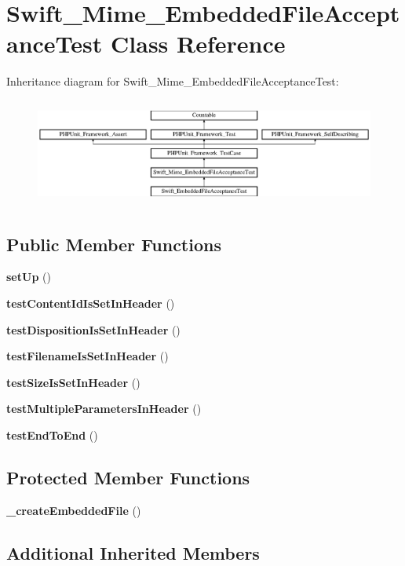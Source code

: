 \section{Swift\+\_\+\+Mime\+\_\+\+Embedded\+File\+Acceptance\+Test Class Reference}
\label{class_swift___mime___embedded_file_acceptance_test}
Inheritance diagram for Swift\+\_\+\+Mime\+\_\+\+Embedded\+File\+Acceptance\+Test\+:\begin{figure}[H]
\begin{center}
\leavevmode
\includegraphics[height=3.562341cm]{class_swift___mime___embedded_file_acceptance_test}
\end{center}
\end{figure}
\subsection*{Public Member Functions}
\begin{DoxyCompactItemize}
\item 
{\bf set\+Up} ()
\item 
{\bf test\+Content\+Id\+Is\+Set\+In\+Header} ()
\item 
{\bf test\+Disposition\+Is\+Set\+In\+Header} ()
\item 
{\bf test\+Filename\+Is\+Set\+In\+Header} ()
\item 
{\bf test\+Size\+Is\+Set\+In\+Header} ()
\item 
{\bf test\+Multiple\+Parameters\+In\+Header} ()
\item 
{\bf test\+End\+To\+End} ()
\end{DoxyCompactItemize}
\subsection*{Protected Member Functions}
\begin{DoxyCompactItemize}
\item 
{\bf \+\_\+create\+Embedded\+File} ()
\end{DoxyCompactItemize}
\subsection*{Additional Inherited Members}


